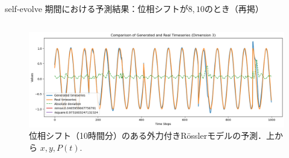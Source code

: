 \begin{frame}{self-evolve 期間における予測結果：位相シフトが$8, 10$のとき（再掲）}
\begin{columns}[T]
\begin{column}{.5\textwidth}
\begin{figure}
          \vspace{.5em}
          \begin{minipage}[c][.27\textheight][c]{\linewidth}
            \centering
            \includegraphics[width=0.7\linewidth]{Fig/10.p.png}
            \caption{\scriptsize{位相シフト（10時間分）のある外力付きRösslerモデルの予測．上から $x, y, P(t)$.}}
          \end{minipage}
        \end{figure}
      \end{column}
    \end{columns}
  \end{frame}

